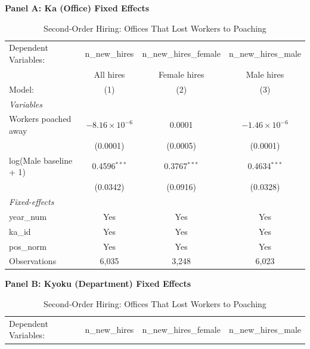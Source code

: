 \begin{table}[htbp]
\centering
\begin{threeparttable}
\caption{Second-Order Hiring: Offices That Lost Workers to Poaching}
\label{tab:donor-hiring}
\small
\textbf{Panel A: Ka (Office) Fixed Effects}\\[1ex]
\begingroup
\centering
\begin{tabular}{lccc}
   \tabularnewline \midrule \midrule
   Dependent Variables:   & n\_new\_hires          & n\_new\_hires\_female    & n\_new\_hires\_male\\     
                          & All hires              & Female hires             & Male hires \\   
   Model:                 & (1)                    & (2)                      & (3)\\  
   \midrule
   \emph{Variables}\\
   Workers poached away   & $-8.16\times 10^{-6}$  & 0.0001                   & $-1.46\times 10^{-6}$\\    
                          & (0.0001)               & (0.0005)                 & (0.0001)\\   
   log(Male baseline + 1) & 0.4596$^{***}$         & 0.3767$^{***}$           & 0.4634$^{***}$\\   
                          & (0.0342)               & (0.0916)                 & (0.0328)\\   
   \midrule
   \emph{Fixed-effects}\\
   year\_num              & Yes                    & Yes                      & Yes\\  
   ka\_id                 & Yes                    & Yes                      & Yes\\  
   pos\_norm              & Yes                    & Yes                      & Yes\\  
   \midrule
   Observations           & 6,035                  & 3,248                    & 6,023\\  
   \midrule \midrule
\end{tabular}
\par\endgroup
\vspace{2ex}
\textbf{Panel B: Kyoku (Department) Fixed Effects}\\[1ex]
\begingroup
\centering
\begin{tabular}{lccc}
   \tabularnewline \midrule \midrule
   Dependent Variables:   & n\_new\_hires          & n\_new\_hires\_female    & n\_new\_hires\_male\\     

\end{tabular}
\end{threeparttable}
\end{table}
